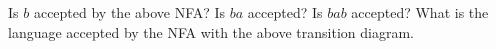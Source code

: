 Is $b$ accepted by the above NFA? Is $ba$ accepted? Is $bab$
accepted? What is the language accepted by the NFA with the above
transition diagram.
